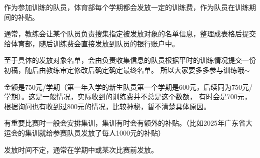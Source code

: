   {}
  {
   }
\setlength{\parindent}{2\ccwd}

作为参加训练的队员，体育部每个学期都会发放一定的训练费，作为队员在训练期间的补贴。

通常，教练会让某个队员负责搜集指定被发放对象的名单信息，整理成表格后提交给体育部，随后训练费会直接发放到队员的银行账户中。

至于具体的发放对象名单，会由负责收集信息的队员根据平时的训练情况提交一份初稿，随后由教练审定修改后确定确定最终名单。
所以大家要多多参与训练哦$\sim$

金额是750元/学期（第一年入学的新生队员第一个学期是600元，后续同为750元/学期）。这是一般情况，实际收到的训练费并不总是这个数额，
有时会是700元，根据询问也有收到过800元的情况，比较神秘，暂不清楚具体原因。

有重要比赛时一般会安排集训，集训有时会有额外的补贴。（比如2025年广东省大运会的集训就给参赛队员发放了每人1000元的补贴）

发放时间不定，通常在学期中或某次比赛前发放。
